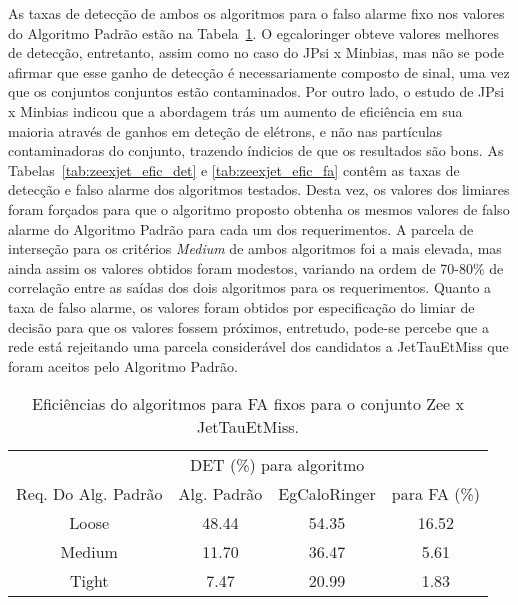 As taxas de detecção de ambos os algoritmos para o falso alarme fixo nos valores
do Algoritmo Padrão estão na Tabela~\ref{tab:zeexjet_efic}. O \gls{egcaloringer}
obteve valores melhores de detecção, entretanto, assim como no caso do JPsi x
Minbias, mas não se pode afirmar que esse ganho de detecção é necessariamente
composto de sinal, uma vez que os conjuntos conjuntos estão contaminados. Por
outro lado, o estudo de JPsi x Minbias indicou que a abordagem trás um aumento
de eficiência em sua maioria através de ganhos em deteção de elétrons, e não nas
partículas contaminadoras do conjunto, trazendo índicios de que os resultados
são bons. As Tabelas~\ref{tab:zeexjet_efic_det} e \ref{tab:zeexjet_efic_fa}
contêm as taxas de detecção e falso alarme dos algoritmos testados. Desta vez,
os valores dos limiares foram forçados para que o algoritmo proposto obtenha os
mesmos valores de falso alarme do Algoritmo Padrão para cada um dos
requerimentos. A parcela de interseção para os critérios \emph{Medium} de ambos
algoritmos foi a mais elevada, mas ainda assim os valores obtidos foram modestos, 
variando na ordem de 70-80\% de correlação entre as saídas dos dois algoritmos
para os requerimentos. Quanto a taxa de falso alarme, os valores foram obtidos
por especificação do limiar de decisão para que os valores fossem próximos,
entretudo, pode-se percebe que a rede está rejeitando uma parcela considerável
dos candidatos a JetTauEtMiss que foram aceitos pelo Algoritmo Padrão.

\begin{table}[htb]
\centering
\begin{tabular}{cccc}
\hline
\hline
 & 
\multicolumn{2}{c}{DET (\%) para algoritmo} & 
\\
\cline{2-3}
\multirow{-2}{*}{Req. Do Alg. Padrão} & 
Alg. Padrão & 
EgCaloRinger & 
\multirow{-2}{*}{para FA (\%)} \\
\hline
Loose &  48.44 & 54.35 & 16.52 \\
Medium & 11.70 & 36.47 & 5.61 \\
Tight & 7.47 & 20.99 &  1.83 \\
\hline
\hline
\end{tabular}
\caption{Eficiências do algoritmos para FA fixos para o conjunto Zee x JetTauEtMiss.}
\label{tab:zeexjet_efic}
\end{table}

